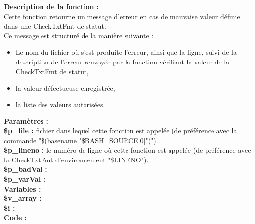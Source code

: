 \documentclass[a4paper,10pt]{article}
\begin{document}
\begin{flushleft}
	\textbf{Description de la fonction :}\\
   	Cette fonction retourne un message d'erreur en cas de mauvaise valeur définie dans une CheckTxtFmt de statut.\\[1\baselineskip]
   	Ce message est structuré de la manière suivante :\\
   	\begin{itemize}
   		\item Le nom du fichier où s'est produite l'erreur, ainsi que la ligne, suivi de la description de l'erreur renvoyée par la fonction vérifiant la valeur de la CheckTxtFmt de statut,
   		\item la valeur défectueuse enregistrée,
   		\item la liste des valeurs autorisées.\\[1\baselineskip]
   	\end{itemize}

   	\textbf{Paramètres :}\\
   	\color{orange}\textbf{\$p\_file\color{white} :} \color{white} fichier dans lequel cette fonction est appelée (de préférence avec la commande "\$(\color{gray}basename \color{white}"\color{orange}\$BASH\_SOURCE[0]\color{white}")").\\
   	\color{orange}\textbf{\$p\_lineno\color{white} :} \color{white} le numéro de ligne où cette fonction est appelée (de préférence avec la CheckTxtFmt d'environnement "\color{orange}\$LINENO\color{white}").\\
   	\color{orange}\textbf{\$p\_badVal\color{white} :} \color{white}\\
   	\color{orange}\textbf{\$p\_varVal\color{white} :} \color{white}\\[1\baselineskip]
    
   	\textbf{Variables :}\\
   	\color{orange}\textbf{\$v\_array\color{white} :} \color{white} \\
   	\color{orange}\textbf{\$i\color{white} :} \color{white}\\[1\baselineskip]

    \textbf{Code :}\\
\end{flushleft}

\color{green}
\end{document}
